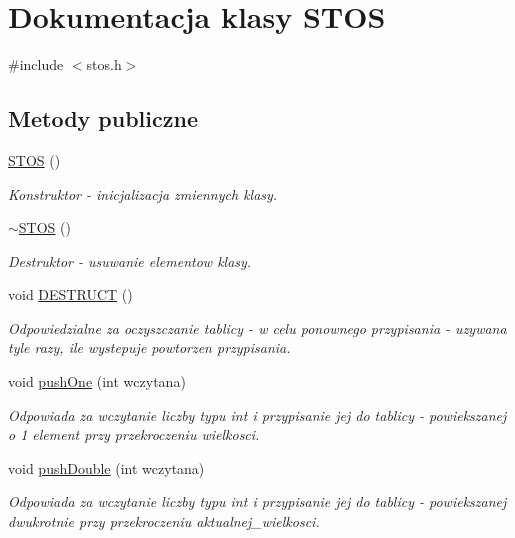 \hypertarget{class_s_t_o_s}{\section{Dokumentacja klasy S\+T\+O\+S}
\label{class_s_t_o_s}
}


{\ttfamily \#include $<$stos.\+h$>$}

\subsection*{Metody publiczne}
\begin{DoxyCompactItemize}
\item 
\hyperlink{class_s_t_o_s_a5e7933ca97741766284d44b4ff1b96e4}{S\+T\+O\+S} ()
\begin{DoxyCompactList}\small\item\em Konstruktor -\/ inicjalizacja zmiennych klasy. \end{DoxyCompactList}\item 
\hyperlink{class_s_t_o_s_a08b99eec2a56204db587544e18224f02}{$\sim$\+S\+T\+O\+S} ()
\begin{DoxyCompactList}\small\item\em Destruktor -\/ usuwanie elementow klasy. \end{DoxyCompactList}\item 
void \hyperlink{class_s_t_o_s_a3e6a3a90202aef6a9f563b6bab3214d9}{D\+E\+S\+T\+R\+U\+C\+T} ()
\begin{DoxyCompactList}\small\item\em Odpowiedzialne za oczyszczanie tablicy -\/ w celu ponownego przypisania -\/ uzywana tyle razy, ile wystepuje powtorzen przypisania. \end{DoxyCompactList}\item 
void \hyperlink{class_s_t_o_s_afd678b5cb3e4d946728ac94fdb537699}{push\+One} (int wczytana)
\begin{DoxyCompactList}\small\item\em Odpowiada za wczytanie liczby typu int i przypisanie jej do tablicy -\/ powiekszanej o 1 element przy przekroczeniu wielkosci. \end{DoxyCompactList}\item 
void \hyperlink{class_s_t_o_s_a2568f71d44b82de409d6fd6c5eb476c7}{push\+Double} (int wczytana)
\begin{DoxyCompactList}\small\item\em Odpowiada za wczytanie liczby typu int i przypisanie jej do tablicy -\/ powiekszanej dwukrotnie przy przekroczeniu aktualnej\+\_\+wielkosci. \end{DoxyCompactList}\item 

\end{DoxyCompactItemize}
